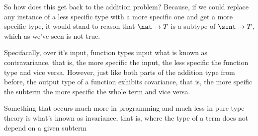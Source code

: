 So how does this get back to the addition problem? 
Because, if we could replace any instance of a less specific type with a more specific one and get a more specific type, it would stand to reason that $\nat \to T$ is a subtype of $\sint \to T$, which as we've seen is not true.

Specifacally, over it's input, function types input what is known as contravariance, that is, the more specific the input, the less specific the function type and vice versa.
However, just like both parts of the addition type from before, the output type of a function exhibits covariance, that is, the more speific the subterm the more specific the whole term and vice versa. \cite{Rustonomicon}

Something that occurs much more in programming and much less in pure type theory is what's known as invariance, that is, where the type of a term does not depend on a given subterm   